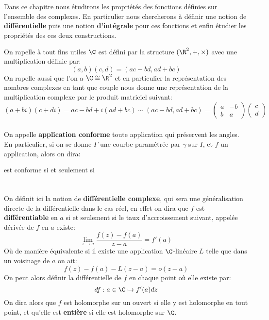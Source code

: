 \chapter*{} %
Dans ce chapitre nous étudirons les propriétés des fonctions définies sur l'ensemble des complexes. En particulier nous chercherons à définir une notion de \textbf{différentielle} puis une notion \textbf{d'intégrale} pour ces fonctions et enfin étudier les propriétés des ces deux constructions.\+

On rapelle à tout fins utiles \(\C\) est défini par la structure \((\R^2, +, \times)\) avec une multiplication définie par:
\[
   (a, b)(c, d) = (ac - bd, ad + bc)
\]
On rapelle aussi que l'on a \(\C \cong \R^2\) et en particulier la représentation des nombres complexes en tant que couple nous donne une représentation de la multiplication complexe par le produit matriciel suivant:
\[
   (a + bi)(c + di) = ac - bd + i(ad + bc) \sim (ac - bd, ad + bc) =  \begin{pmatrix}
      a & -b \\
      b & a
   \end{pmatrix} \begin{pmatrix}  c \\ d \end{pmatrix}
\]
\subsection*{}
On appelle \textbf{application conforme} toute application qui préservent les angles. En particulier, si on se donne \(\Gamma\) une courbe paramétrée par \(\gamma\) sur \(I\), et \(f\) un application, alors on dira:

est conforme si et seulement si


\chapter*{} %
On définit ici la notion de \textbf{différentielle complexe}, qui sera une généralisation directe de la différentielle dans le cas réel, en effet on dira que \(f\) est \textbf{différentiable} en \(a\) si et seulement si le taux d'accroissement suivant, appelée dérivée de \(f\) en \(a\) existe:
\[
   \lim_{z \rightarrow a} \frac{f(z) - f(a)}{z - a} = f'(a)
\]
Où de manière équivalente si il existe une application \(\C\)-linéaire \(L\) telle que dans un voisinage de \(a\) on ait:
\[
   f(z) - f(a) - L(z - a) = o(z - a)
\]
On peut alors définir la différentielle de \(f\) en chaque point où elle existe par:
\[
   df : a \in \C \mapsto f'(a)dz
\]
On dira alors que \(f\) est holomorphe sur un ouvert si elle y est holomorphe en tout point, et qu'elle est \textbf{entière} si elle est holomorphe sur \(\C\).
